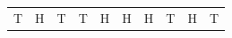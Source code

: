 {{\begin{center}
\begin{xtabular}[t]{|l|l|l|l|l|l|l|l|l|l|}
    
        T &
    
    
        H &
    
    
        T &
    
    
        T &
    
    
        H &
    
    
        H &
    
    
        H &
    
    
        T &
    
    
        H &
    
    
        T%
     \tabularnewline{}
    

\end{xtabular}
\end{center}}}
